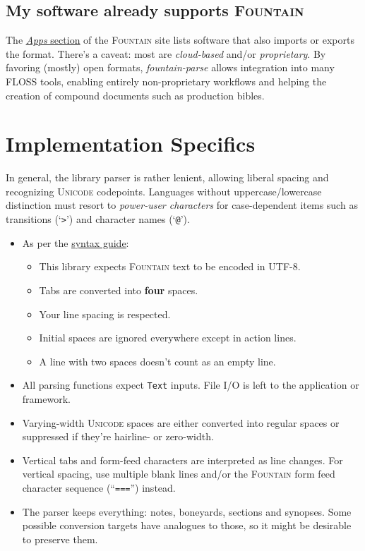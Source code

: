 \documentclass[11pt]{article}
\newcommand{\link}[2]{\underline{\color{darkblue}\href{#1}{#2}}}
\begin{document}
\subsection*{My software already supports \textsc{Fountain}}
The \link{https://fountain.io/apps/}{\emph{Apps} section} of the
\textsc{Fountain} site lists software that also imports or exports the
format. There's a caveat: most are \emph{cloud-based} and/or
\emph{proprietary}. By favoring (mostly) open formats,
\emph{fountain-parse} allows integration into many \textsc{FLOSS} tools,
enabling entirely non-proprietary workflows and helping the creation of
compound documents such as production bibles.

\section*{Implementation Specifics}
In general, the library parser is rather lenient, allowing liberal
spacing and recognizing \textsc{Unicode} codepoints. Languages without
uppercase/lowercase distinction must resort to \emph{power-user
characters} for case-dependent items such as transitions (`\texttt{>}')
and character names (`\texttt{@}').
\begin{itemize}
  \item As per the \link{https://fountain.io/syntax/}{syntax guide}:
    \begin{itemize}
      \item This library expects \textsc{Fountain} text to be encoded
        in \textsc{UTF-8}\@.
      \item Tabs are converted into \textbf{four} spaces.
      \item Your line spacing is respected.
      \item Initial spaces are ignored everywhere except in action
        lines.
      \item A line with two spaces doesn't count as an empty line.
    \end{itemize}
  \item All parsing functions expect \texttt{Text} inputs.  File I/O
    is left to the application or framework.
  \item Varying-width \textsc{Unicode} spaces are either converted
    into regular spaces or suppressed if they're hairline- or
    zero-width.
  \item Vertical tabs and form-feed characters are interpreted as line
    changes. For vertical spacing, use multiple blank lines and/or the
    \textsc{Fountain} form feed character sequence (``\texttt{===}'')
    instead.
  \item The parser keeps everything: notes, boneyards, sections and
    synopses. Some possible conversion targets have analogues to
    those, so it might be desirable to preserve them.
\end{itemize}
\end{document}
